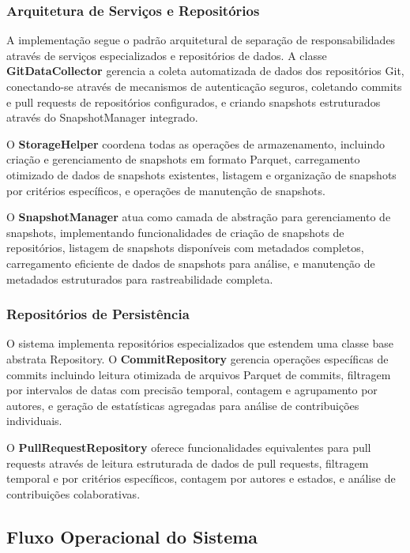 \documentclass[12pt,a4paper]{article}
\begin{document}
\subsubsection{Arquitetura de Serviços e Repositórios}

A implementação segue o padrão arquitetural de separação de responsabilidades através de serviços especializados e repositórios de dados. A classe \textbf{GitDataCollector} gerencia a coleta automatizada de dados dos repositórios Git, conectando-se através de mecanismos de autenticação seguros, coletando commits e pull requests de repositórios configurados, e criando snapshots estruturados através do SnapshotManager integrado.

O \textbf{StorageHelper} coordena todas as operações de armazenamento, incluindo criação e gerenciamento de snapshots em formato Parquet, carregamento otimizado de dados de snapshots existentes, listagem e organização de snapshots por critérios específicos, e operações de manutenção de snapshots.

O \textbf{SnapshotManager} atua como camada de abstração para gerenciamento de snapshots, implementando funcionalidades de criação de snapshots de repositórios, listagem de snapshots disponíveis com metadados completos, carregamento eficiente de dados de snapshots para análise, e manutenção de metadados estruturados para rastreabilidade completa.

\subsubsection{Repositórios de Persistência}

O sistema implementa repositórios especializados que estendem uma classe base abstrata Repository. O \textbf{CommitRepository} gerencia operações específicas de commits incluindo leitura otimizada de arquivos Parquet de commits, filtragem por intervalos de datas com precisão temporal, contagem e agrupamento por autores, e geração de estatísticas agregadas para análise de contribuições individuais.

O \textbf{PullRequestRepository} oferece funcionalidades equivalentes para pull requests através de leitura estruturada de dados de pull requests, filtragem temporal e por critérios específicos, contagem por autores e estados, e análise de contribuições colaborativas.

\subsection{Fluxo Operacional do Sistema}
\end{document}
